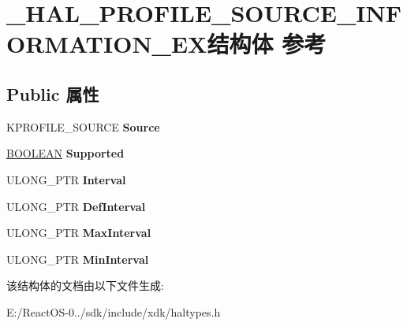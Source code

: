 \hypertarget{struct___h_a_l___p_r_o_f_i_l_e___s_o_u_r_c_e___i_n_f_o_r_m_a_t_i_o_n___e_x}{}\section{\+\_\+\+H\+A\+L\+\_\+\+P\+R\+O\+F\+I\+L\+E\+\_\+\+S\+O\+U\+R\+C\+E\+\_\+\+I\+N\+F\+O\+R\+M\+A\+T\+I\+O\+N\+\_\+\+E\+X结构体 参考}
\label{struct___h_a_l___p_r_o_f_i_l_e___s_o_u_r_c_e___i_n_f_o_r_m_a_t_i_o_n___e_x}
\subsection*{Public 属性}
\begin{DoxyCompactItemize}
\item 
\mbox{\label{struct___h_a_l___p_r_o_f_i_l_e___s_o_u_r_c_e___i_n_f_o_r_m_a_t_i_o_n___e_x_a5ce225cc5857091dfce98e7a46925928}} 
K\+P\+R\+O\+F\+I\+L\+E\+\_\+\+S\+O\+U\+R\+CE {\bfseries Source}
\item 
\mbox{\label{struct___h_a_l___p_r_o_f_i_l_e___s_o_u_r_c_e___i_n_f_o_r_m_a_t_i_o_n___e_x_a25d990779ae91d201a97b9772fa7fc09}} 
\hyperlink{_processor_bind_8h_a112e3146cb38b6ee95e64d85842e380a}{B\+O\+O\+L\+E\+AN} {\bfseries Supported}
\item 
\mbox{\label{struct___h_a_l___p_r_o_f_i_l_e___s_o_u_r_c_e___i_n_f_o_r_m_a_t_i_o_n___e_x_a6adcaf510b9a8460836ad4d2fd62b3f9}} 
U\+L\+O\+N\+G\+\_\+\+P\+TR {\bfseries Interval}
\item 
\mbox{\label{struct___h_a_l___p_r_o_f_i_l_e___s_o_u_r_c_e___i_n_f_o_r_m_a_t_i_o_n___e_x_aae161f52239a6bef3091dff6379b9f23}} 
U\+L\+O\+N\+G\+\_\+\+P\+TR {\bfseries Def\+Interval}
\item 
\mbox{\label{struct___h_a_l___p_r_o_f_i_l_e___s_o_u_r_c_e___i_n_f_o_r_m_a_t_i_o_n___e_x_a37510fbf02f6e5c9c2f34699ea1fce4f}} 
U\+L\+O\+N\+G\+\_\+\+P\+TR {\bfseries Max\+Interval}
\item 
\mbox{\label{struct___h_a_l___p_r_o_f_i_l_e___s_o_u_r_c_e___i_n_f_o_r_m_a_t_i_o_n___e_x_af999cda1b7b6917241b4cb0e56aed08c}} 
U\+L\+O\+N\+G\+\_\+\+P\+TR {\bfseries Min\+Interval}
\end{DoxyCompactItemize}


该结构体的文档由以下文件生成\+:\begin{DoxyCompactItemize}
\item 
E\+:/\+React\+O\+S-\/0../sdk/include/xdk/haltypes.\+h\end{DoxyCompactItemize}
